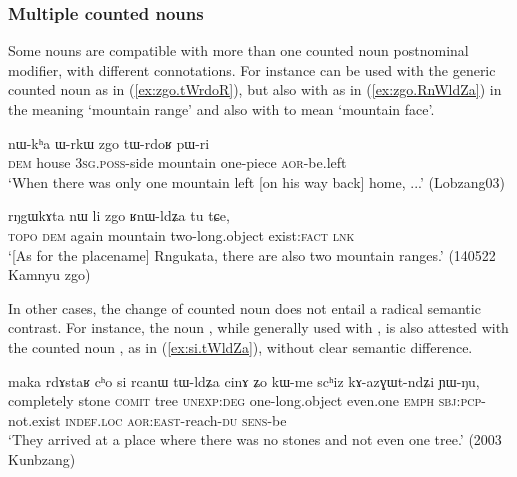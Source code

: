 \subsubsection{Multiple counted nouns} \label{sec:multiple.CN}
Some nouns are compatible with more than one counted noun postnominal modifier, with different connotations. For instance  can be used with the generic counted noun  as in (\ref{ex:zgo.tWrdoR}), but also with    as in (\ref{ex:zgo.RnWldZa}) in the meaning `mountain range' and also with  to mean `mountain face'.

\begin{exe}
\ex \label{ex:zgo.tWrdoR}
\gll nɯ-kʰa ɯ-rkɯ zgo tɯ-rdoʁ pɯ-ri \\
\textsc{dem} house \textsc{3sg}.\textsc{poss}-side mountain one-piece \textsc{aor}-be.left  \\
\glt `When there was only one mountain left [on his way back] home, ...' (Lobzang03)
\end{exe}

\begin{exe}
\ex \label{ex:zgo.RnWldZa}
\gll rŋgɯkɤta nɯ li zgo ʁnɯ-ldʑa tu tɕe, \\
\textsc{topo} \textsc{dem} again mountain two-long.object exist:\textsc{fact} \textsc{lnk} \\
\glt `[As for the placename] Rngukata, there are also two mountain ranges.' (140522 Kamnyu zgo)
\end{exe}

In other cases, the change of counted noun does not entail a radical semantic contrast. For instance, the noun , while generally used with , is also attested with the counted noun , as in (\ref{ex:si.tWldZa}), without clear semantic difference.

\begin{exe}
\ex \label{ex:si.tWldZa}
\gll maka rdɤstaʁ cʰo si rcanɯ tɯ-ldʑa cinɤ ʑo kɯ-me scʰiz kɤ-azɣɯt-ndʑi ɲɯ-ŋu, \\
completely stone \textsc{comit} tree \textsc{unexp}:\textsc{deg} one-long.object even.one \textsc{emph} \textsc{sbj}:\textsc{pcp}-not.exist \textsc{indef}.\textsc{loc} \textsc{aor}:\textsc{east}-reach-\textsc{du} \textsc{sens}-be  \\
\glt `They arrived at a place where there was no stones and not even one tree.' (2003 Kunbzang)
\end{exe}




